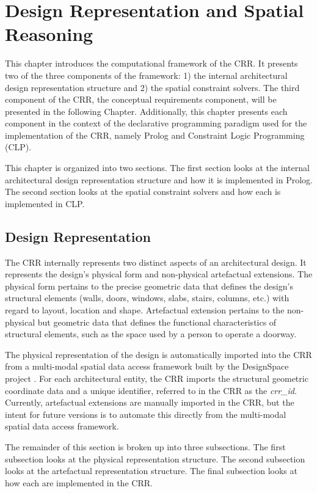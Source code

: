 \documentclass[12pt]{ucthesis}
\begin{document}
\chapter{Design Representation and Spatial Reasoning}
This chapter introduces the computational framework of the CRR. It presents two of the three components of the framework: 1) the internal architectural design representation structure and 2) the spatial constraint solvers. The third component  of the CRR, the conceptual requirements component, will be presented in the following Chapter. Additionally, this chapter presents each component in the context of the declarative programming paradigm used for the implementation of the CRR, namely Prolog and Constraint Logic Programming (CLP). 

This chapter is organized into two sections. The first section looks at the internal architectural design representation structure and how it is implemented in Prolog. The second section looks at the spatial constraint solvers and how each is implemented in CLP.

\section{Design Representation}
The CRR internally represents two distinct aspects of an architectural design. It represents the design's physical form and non-physical artefactual extensions. The physical form pertains to the precise geometric data that defines the design's structural elements (walls, doors, windows, slabs, stairs, columns, etc.) with regard to layout, location and shape. Artefactual extension pertains to the non-physical but geometric data that defines the functional characteristics of structural elements, such as the space used by a person to operate a doorway.

The physical representation of the design is automatically imported into the CRR from a multi-modal spatial data access framework \cite{MultiModal} built by the DesignSpace project \cite{DesignSpace}. For each architectural entity, the CRR imports the structural geometric coordinate data and a unique identifier, referred to in the CRR as the \emph{crr\_id}. Currently, artefactual extensions are manually imported in the CRR, but the intent for future versions is to automate this directly from the multi-modal spatial data access framework.  

The remainder of this section is broken up into three subsections. The first subsection looks at the physical representation structure. The second subsection looks at the artefactual representation structure. The final subsection looks at how each are implemented in the CRR.
\end{document}
